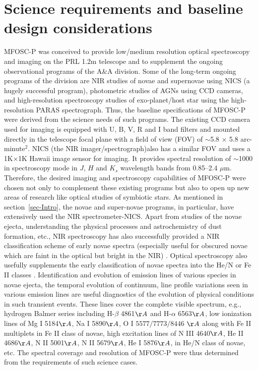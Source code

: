 \section{Science requirements and baseline design considerations} 
\label{sec-BaseDesign}

MFOSC-P was conceived to provide low/medium resolution optical spectroscopy and imaging on the PRL 1.2m telescope and to supplement the ongoing observational programs of the A\&A division. Some of the long-term ongoing programs of the division are NIR studies of novae and supernovae using NICS (a hugely successful program), photometric studies of AGNs using CCD cameras, and high-resolution spectroscopy studies of exo-planet/host star using the high-resolution PARAS spectrograph. Thus, the baseline specifications of MFOSC-P were derived from the science needs of such programs. The existing CCD camera used for imaging is equipped with U, B, V, R and I band filters and mounted directly in the telescope focal plane with a field of view (FOV) of $\sim$5.8 $\times$ 5.8 arc-minute${^2}$. NICS (the NIR imager/spectrograph)also has a similar FOV  and uses a 1K$\times$1K Hawaii image sensor for imaging. It provides spectral resolution of $\sim$1000 in spectroscopy mode in $J$, $H$ and $K_s$ wavelength bands from 0.85–2.4 $\mu$m. Therefore, the desired imaging and spectroscopy capabilities of MFOSC-P were chosen not only to complement these existing programs but also to open up new areas of research like optical studies of symbiotic stars. As mentioned in section~\ref{sec-Intro}, the novae and super-novae programs, in particular, have extensively used the NIR spectrometer-NICS. Apart from studies of the novae ejecta, understanding the physical processes and astrochemistry of dust formation, etc.,  NIR spectroscopy has also successfully provided a NIR classification scheme of early novae spectra (especially useful for obscured novae which are faint in the optical but bright in the NIR) \citep{Banerjee2012, Banerjee2018b}. Optical spectroscopy also usefully supplements the early classification of novae spectra into the He/N or Fe II classes \citep{Williams1992}. Identification and evolution of emission lines of various species in novae ejecta, the temporal evolution of continuum, line profile variations seen in various emission lines are useful diagnostics of the evolution of physical conditions in such transient events. These lines cover the complete visible spectrum, e.g., hydrogen Balmer series including H-$\beta$ 4861$\AA$ and H-$\alpha$ 6563$\AA$, low ionization lines of Mg I 5184$\AA$, Na I 5890$\AA$, O I $5577/7773/8446$ $\AA$ along with Fe II multiplets in Fe II class of novae, high excitation lines of N III 4640$\AA$, He II 4686$\AA$, N II 5001$\AA$, N II 5679$\AA$, He I 5876$\AA$, in He/N class of novae, etc. The spectral coverage and resolution of MFOSC-P were thus determined from the requirements of such science cases.
